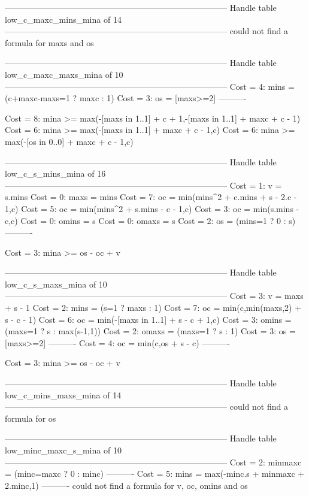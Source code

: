 --------------------------------------------------------------------------------
Handle table low_c_maxc_mins_mina of 14
--------------------------------------------------------------------------------
could not find a formula for maxs and os


--------------------------------------------------------------------------------
Handle table low_c_maxc_maxs_mina of 10
--------------------------------------------------------------------------------
Cost =  4:  mins = (c+maxc-maxs=1 ? maxc : 1)
Cost =  3:  os   = [maxs>=2]
----------

Cost =  8:  mina >= max(-[maxs in 1..1] + c + 1,-[maxs in 1..1] + maxc + c - 1)
Cost =  6:  mina >= max(-[maxs in 1..1] + maxc + c - 1,c)
Cost =  6:  mina >= max(-[os in 0..0] + maxc + c - 1,c)

--------------------------------------------------------------------------------
Handle table low_c_s_mins_mina of 16
--------------------------------------------------------------------------------
Cost =  1:  v     = s.mins
Cost =  0:  maxs  = mins
Cost =  7:  oc    = min(mins^2 + c.mins + s - 2.c - 1,c)
Cost =  5:  oc    = min(mins^2 + s.mins - c - 1,c)
Cost =  3:  oc    = min(s.mins - c,c)
Cost =  0:  omins = s
Cost =  0:  omaxs = s
Cost =  2:  os    = (mins=1 ? 0 : s)
----------

Cost =  3:  mina >= os - oc + v

--------------------------------------------------------------------------------
Handle table low_c_s_maxs_mina of 10
--------------------------------------------------------------------------------
Cost =  3:  v     = maxs + s - 1
Cost =  2:  mins  = (s=1 ? maxs : 1)
Cost =  7:  oc    = min(c,min(maxs,2) + s - c - 1)
Cost =  6:  oc    = min(-[maxs in 1..1] + s - c + 1,c)
Cost =  3:  omins = (maxs=1 ? s : max(s-1,1))
Cost =  2:  omaxs = (maxs=1 ? s : 1)
Cost =  3:  os    = [maxs>=2]
----------
Cost =  4:  oc    = min(c,os + s - c)
----------

Cost =  3:  mina >= os - oc + v

--------------------------------------------------------------------------------
Handle table low_c_mins_maxs_mina of 14
--------------------------------------------------------------------------------
could not find a formula for os


--------------------------------------------------------------------------------
Handle table low_minc_maxc_s_mina of 10
--------------------------------------------------------------------------------
Cost =  2:  minmaxc = (minc=maxc ? 0 : minc)
----------
Cost =  5:  mins    = max(-minc.s + minmaxc + 2.minc,1)
----------
could not find a formula for v, oc, omins and os

